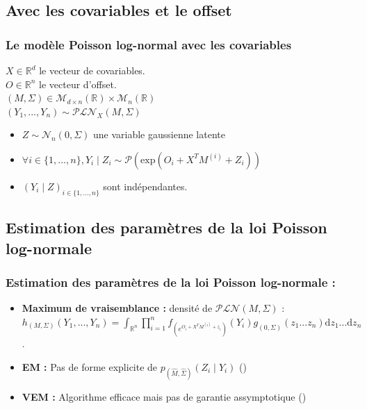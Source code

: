 \documentclass[11pt,table]{beamer}
\begin{document}
\subsection{Avec les covariables et le offset}

\begin{frame}
\frametitle{Le modèle Poisson log-normal avec les covariables}
$X \in \mathbb{R}^d$ le vecteur de covariables.\\
$O \in \mathbb{R}^n$ le vecteur d'offset.\\
\vspace{0.5cm}
$(M, \Sigma) \in \mathcal{M}_{d \times n}(\mathbb{R}) \times \mathcal{M}_n(\mathbb{R})$\\
\vspace{0.5cm}
$(Y_1,...,Y_n) \sim \mathcal{PLN}_X (M,\Sigma)$  \\

\begin{itemize}
\item  $Z \sim \mathcal{N}_n(0,\Sigma)$ une variable gaussienne  latente

\item$\forall i \in \{1,...,n\}, Y_i\mid Z_i \sim \mathcal{P}(\mathrm{exp}(O_i+X^T M^{(i)}+Z_i))$

\item $(Y_i\mid Z )_{i \in \{1,...,n\}}$ sont indépendantes.
\end{itemize}
\end{frame}

\subsection{Estimation des paramètres de la loi Poisson log-normale}
\begin{frame}
\frametitle{Estimation des paramètres de la loi Poisson log-normale :}
\begin{itemize}
\item \textbf{Maximum de vraisemblance :} densité de $\mathcal{PLN}(M,\Sigma)$ : $h_{(M,\Sigma)}(Y_1,...,Y_n) = \int_{\mathbb{R}^n} \prod_{i=1}^n f_{(e^{O_i+X^T M^{(i)} + z_i})}(Y_i) g_{(0,\Sigma)}(z_1...z_n) \mathrm{d}z_1...\mathrm{d}z_n$.
\item \textbf{EM :} Pas de forme explicite de $p_{(\widehat{M},\widehat{\Sigma})}(Z_i \mid Y_i)$ (\cite{Karlis2005})
\item \textbf{VEM :} Algorithme efficace mais pas de garantie assymptotique (\cite{Chiquet2017variational})
\end{itemize}
\end{frame}
\end{document}
